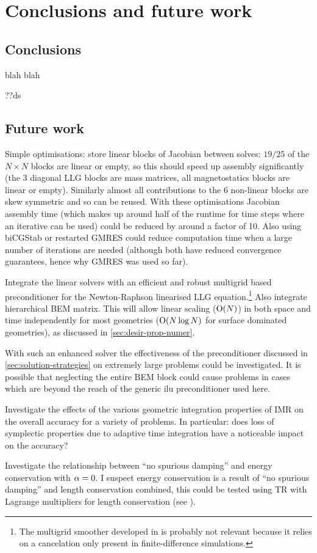 \chapter{Conclusions and future work}

\section{Conclusions}

blah blah

??ds


\section{Future work}

Simple optimisations: store linear blocks of Jacobian between solves: $19/25$ of the $N \times N$ blocks are linear or empty, so this should speed up assembly significantly (the 3 diagonal LLG blocks are mass matrices, all magnetostatics blocks are linear or empty).
Similarly almost all contributions to the 6 non-linear blocks are skew symmetric and so can be reused.
With these optimisations Jacobian assembly time (which makes up around half of the runtime for time steps where an iterative can be used) could be reduced by around a factor of 10.
Also using biCGStab or restarted GMRES could reduce computation time when a large number of iterations are needed (although both have reduced convergence guarantees, hence why GMRES was used so far).


Integrate the linear solvers with an efficient and robust multigrid based preconditioner for the Newton-Raphson linearised LLG equation.\footnote{The multigrid smoother developed in \cite{Jeong2014} is probably not relevant because it relies on a cancelation only present in finite-difference simulations.}
Also integrate hierarchical BEM matrix.
This will allow linear scaling (\ie $\mathrm{O}{\left( N \right)}$) in both space and time independently for most geometries ($\mathrm{O}{\left( N \log N \right)}$ for surface dominated geometries), as discussed in \cref{sec:desir-prop-numer}.


With such an enhanced solver the effectiveness of the preconditioner discussed in \cref{sec:solution-strategies} on extremely large problems could be investigated.
It is possible that neglecting the entire BEM block could cause problems in cases which are beyond the reach of the generic ilu preconditioner used here.


Investigate the effects of the various geometric integration properties of IMR on the overall accuracy for a variety of problems.
In particular: does loss of symplectic properties due to adaptive time integration have a noticeable impact on the accuracy?


Investigate the relationship between ``no spurious damping'' and energy conservation with $\alpha = 0$.
I suspect energy conservation is a result of ``no spurious damping'' and length conservation combined, this could be tested using TR with Lagrange multipliers for length conservation (see \eg \cite{Szambolics2008a}).


